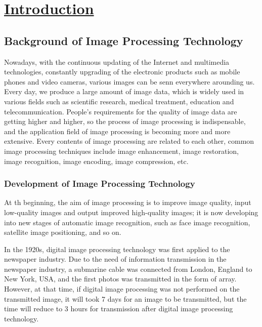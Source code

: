 
\chapter{\protect\hyperlink{:}{Introduction}}
\setcounter{page}{1}   %
\thispagestyle{fancy} %
\setmainfont{Arial} %
\fontsize{11pt}{12.65pt}\selectfont %
\setlength{\parindent}{0pt} %
\setlength{\parskip}{10pt} %
\section{Background of Image Processing Technology}

Nowadays, with the continuous updating of the Internet and multimedia technologies, constantly upgrading of the electronic products such as mobile phones and video cameras, various images can be senn everywhere arounding us. Every day, we produce a large amount of image data, which is widely used in various fields such as scientific research, medical treatment, education and telecommunication. People's requirements for the quality of image data are getting higher and higher, so the process of image processing is indispensable, and the application field of image processing is becoming more and more extensive. Every contents of image processing are related to each other, common image processing techniques include image enhancement, image restoration, image recognition, image encoding, image compression, etc.
\subsection{Development of Image Processing Technology}

At th beginning, the aim of image processing is to improve image quality, input low-quality images and output improved high-quality images; it is now developing into new stages of automatic image recognition, such as face image recognition, satellite image positioning, and so on.

In the 1920s, digital image processing technology was first applied to the newspaper industry. Due to the need of information transmission in the newspaper industry, a submarine cable was connected from London, England to New York, USA, and the first photos was transmitted in the form of array. However, at that time, if digital image processing was not performed on the transmitted image, it will took 7 days for an image to be transmitted, but the time will reduce to 3 hours for transmission after digital image processing technology.

